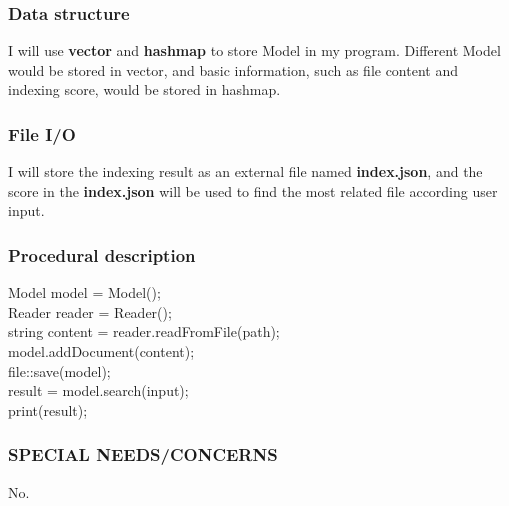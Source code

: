 \documentclass{article}
\begin{document}
\subsubsection*{Data structure}

I will use \textbf{vector} and \textbf{hashmap} to store Model in my program. Different Model would be stored in vector, and basic information, such as file content and indexing score, would be stored in hashmap.

\subsubsection*{File I/O}

I will store the indexing result as an external file named \textbf{index.json}, and the score in the \textbf{index.json} will be used to find the most related file according user input.

\subsubsection*{Procedural description}

Model model = Model(); \\
Reader reader = Reader(); \\
string content = reader.readFromFile(path); \\
model.addDocument(content); \\
file::save(model); \\
result = model.search(input); \\
print(result);

\subsubsection*{SPECIAL NEEDS/CONCERNS}

No.
\end{document}
